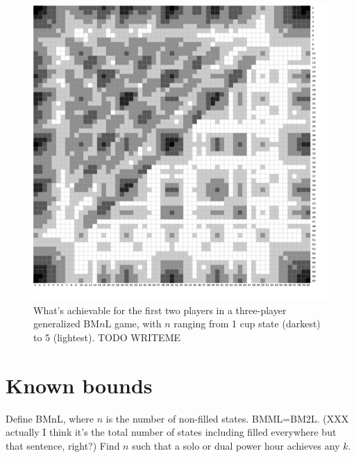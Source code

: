 \documentclass[twocolumn]{article}
\begin{document}
\begin{figure}
\begin{center}
\includegraphics[width=0.90 \linewidth]{composite2playermock.png}
\end{center}\vspace{-0.1in}
\caption{What's achievable for the first two players in a three-player
  generalized BM$n$L game, with $n$ ranging from 1 cup state (darkest)
  to 5 (lightest). TODO WRITEME
}
\label{fig:composite2player}
\end{figure}


\section{Known bounds}

Define BMnL, where $n$ is the number of non-filled states. BMML=BM2L.
(XXX actually I think it's the total number of states including filled
everywhere but that sentence, right?)  Find $n$ such that a solo or
dual power hour achieves any $k$.
\end{document}
